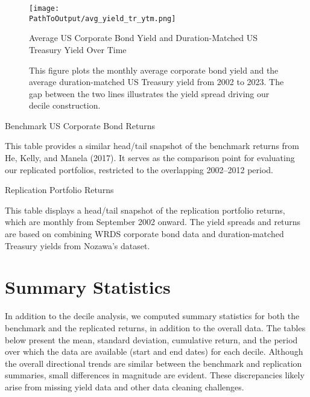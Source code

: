 \documentclass[12pt]{article}
\begin{document}
\begin{figure}[H]
  \centering
  \texttt{[image: \\PathToOutput/avg\_yield\_tr\_ytm.png]}
  \caption{Average US Corporate Bond Yield and Duration-Matched US Treasury Yield Over Time}
  \caption*{\footnotesize This figure plots the monthly average corporate bond yield and the average duration-matched US Treasury yield from 2002 to 2023. The gap between the two lines illustrates the yield spread driving our decile construction.}
  \label{fig:avg_yield_tr_ytm}
  \end{figure}

\begin{table}[htbp]
  \centering
  \caption{Benchmark US Corporate Bond Returns}
  {\footnotesize
  \renewcommand{\arraystretch}{0.9}
  \resizebox{\textwidth}{!}{%
    
  }
  }
  \caption*{\footnotesize This table provides a similar head/tail snapshot of the benchmark returns from He, Kelly, and Manela (2017). It serves as the comparison point for evaluating our replicated portfolios, restricted to the overlapping 2002--2012 period.}
  \label{table:benchmark}
  \end{table}

\begin{table}[htbp]
\centering
\caption{Replication Portfolio Returns}
{\footnotesize
\renewcommand{\arraystretch}{0.9} %
\resizebox{\textwidth}{!}{%
  
}
}
\caption*{\footnotesize This table displays a head/tail snapshot of the replication portfolio returns, which are monthly from September 2002 onward. The yield spreads and returns are based on combining WRDS corporate bond data and duration-matched Treasury yields from Nozawa’s dataset.}
\label{table:replication_sample}
\end{table}


\section{Summary Statistics}
In addition to the decile analysis, we computed summary statistics for both the benchmark and the replicated returns, in addition to the overall data. The tables below present the mean, standard deviation, cumulative return, and the period over which the data are available (start and end dates) for each decile. Although the overall directional trends are similar between the benchmark and replication summaries, small differences in magnitude are evident. These discrepancies likely arise from missing yield data and other data cleaning challenges.
\end{document}
